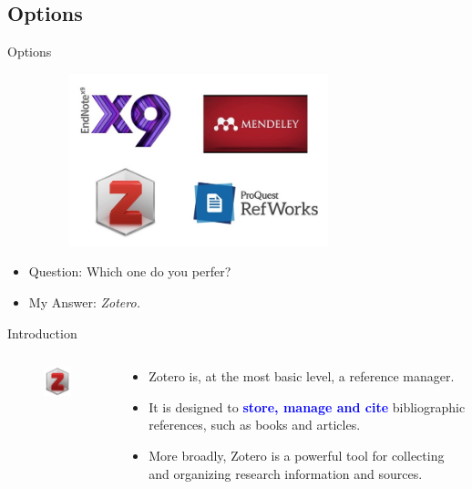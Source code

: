 \documentclass[UTF8]{beamer}
\begin{document}
\subsection{Options}
\begin{frame}{Options}
\begin{figure}
  \centering
  \includegraphics[width=90mm, height=50mm]{figures/different_tools.jpg}
 \end{figure}
\begin{itemize}
\item Question: Which one do you perfer?
\item My Answer: \textit{Zotero.}
\end{itemize}
\end{frame}

\begin{frame}{Introduction}
\begin{columns}
\begin{column}{.3\linewidth}
\begin{figure}
\centering
\includegraphics[width=30mm]{figures/Zotero_icon.png}
\end{figure}
\end{column}
\begin{column}{.7\linewidth}
\begin{itemize}
\item Zotero is, at the most basic level, a reference manager.
\item It is designed to \textbf{\textcolor{blue}{store, manage and cite}} bibliographic references, such as books and articles.
\item More broadly, Zotero is a powerful tool for collecting and organizing research information and sources.
\end{itemize}
\end{column}
\end{columns}
\end{frame}
\end{document}
